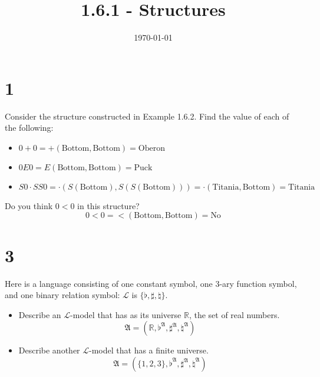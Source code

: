 \documentclass{article}
\begin{document}
\title{1.6.1 - Structures}
\date{\today}

\maketitle

\section*{1}
Consider the structure constructed in Example 1.6.2. 
Find the value of each of the following: 
\begin{itemize}
    \item $0+0=
        +(\text{Bottom},\text{Bottom})=
        \text{Oberon}$

    \item $0E0=
        E(\text{Bottom},\text{Bottom})=
        \text{Puck}$

    \item $S0\cdot SS0=
        \cdot(S(\text{Bottom}), S(S(\text{Bottom})))=
        \cdot(\text{Titania}, \text{Bottom})=
        \text{Titania}
        $
\end{itemize}

Do you think $0<0$ in this structure?
$$
    0<0=
    <(\text{Bottom},\text{Bottom})=\text{No}
$$



\section*{3} 
Here is a language consisting of one constant symbol, 
one 3-ary function symbol, and one binary relation symbol: 
$\mathcal{L}$ is $\{\flat,\sharp,\natural\}$. 

\begin{itemize}
    \item Describe an $\mathcal{L}$-model that has as its universe $\mathbb{R}$, 
    the set of real numbers.
    $$
        \mathfrak{A} = (\mathbb{R}, \flat^\mathfrak{A}, \sharp^\mathfrak{A}, \natural^\mathfrak{A})
    $$

    \item Describe another $\mathcal{L}$-model that has a finite universe.
    $$
        \mathfrak{A} = (\{1,2,3\}, \flat^\mathfrak{A}, \sharp^\mathfrak{A}, \natural^\mathfrak{A})
    $$

\end{itemize}
\end{document}
